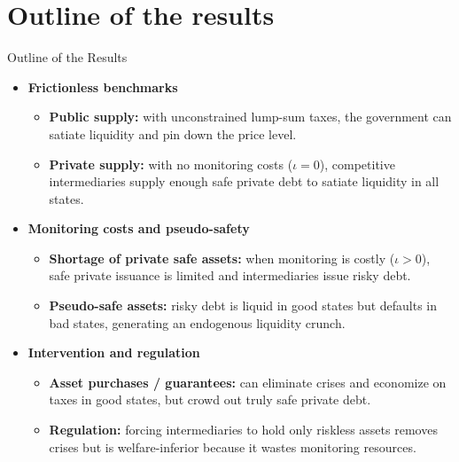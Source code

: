 \documentclass[11pt,aspectratio=169]{beamer}
\begin{document}
\section{Outline of the results}
\begin{frame}{Outline of the Results}
\small
\begin{itemize}
  \item \textbf{Frictionless benchmarks}
  \begin{itemize}
    \item \textbf{Public supply:} with unconstrained lump-sum taxes, the government can satiate liquidity and pin down the price level.
    \item \textbf{Private supply:} with no monitoring costs ($\iota=0$), competitive intermediaries supply enough safe private debt to satiate liquidity in all states.
  \end{itemize}

  \vspace{0.35em}
  \item \textbf{Monitoring costs and pseudo-safety}
  \begin{itemize}
    \item \textbf{Shortage of private safe assets:} when monitoring is costly ($\iota>0$), safe private issuance is limited and intermediaries issue risky debt.
    \item \textbf{Pseudo-safe assets:} risky debt is liquid in good states but defaults in bad states, generating an endogenous liquidity crunch.
  \end{itemize}

  \vspace{0.35em}
  \item \textbf{Intervention and regulation}
  \begin{itemize}
    \item \textbf{Asset purchases / guarantees:} can eliminate crises and economize on taxes in good states, but crowd out truly safe private debt.
    \item \textbf{Regulation:} forcing intermediaries to hold only riskless assets removes crises but is welfare-inferior because it wastes monitoring resources.
  \end{itemize}
\end{itemize}
\end{frame}


\end{document}
